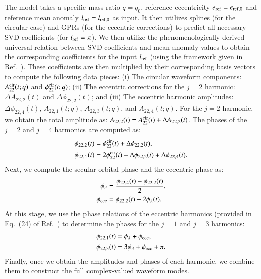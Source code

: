 \documentclass[aps,prd,amsmath,floats,floatfix, twocolumn,
superscriptaddress,nofootinbib,showpacs,longbibliography]{revtex4-1}
\begin{document}
The model takes a specific mass ratio $q = q_0$, reference eccentricity $e_{\rm ref} = e_{\rm ref,0}$ and reference mean anomaly $l_{\rm ref} = l_{\rm ref,0}$ as input. It then utilizes splines (for the circular case) and GPRs (for the eccentric corrections) to predict all necessary SVD coefficients (for $l_{\rm ref}=\pi$). We then utilize the phenomenologically derived universal relation between SVD coefficients and mean anomaly values to obtain the corresponding coefficients for the input $l_{\rm ref}$ (using the framework given in Ref.~\cite{Islam2025InPrep}).
These coefficients are then multiplied by their corresponding basis vectors to compute the following data pieces: (i) The circular waveform components: $A_{22}^{\rm cir}(t;q)$ and $\phi_{22}^{\rm cir}(t;q)$; (ii) The eccentric corrections for the $j=2$ harmonic: $\Delta A_{22,2}(t)$ and $\Delta \phi_{22,2}(t)$; and (iii) The eccentric harmonic amplitudes: $\Delta \phi_{22,4}(t)$, $A_{22,1}(t;q)$, $A_{22,3}(t;q)$, and $A_{22,4}(t;q)$.   
For the $j=2$ harmonic, we obtain the total amplitude as: $A_{22,2}(t) = A_{22}^{\rm cir}(t) + \Delta A_{22,2}(t)$.
The phases of the $j=2$ and $j=4$ harmonics are computed as:
\begin{align}
\phi_{22,2}(t) &= \phi_{22}^{\rm cir}(t) + \Delta \phi_{22,2}(t),\\
\phi_{22,4}(t) &= 2\phi_{22}^{\rm cir}(t) + \Delta \phi_{22,2}(t) + \Delta \phi_{22,4}(t).
\end{align}
Next, we compute the secular orbital phase and the eccentric phase as:
\begin{align}
\phi_{\lambda} &= \frac{\phi_{22,4}(t) - \phi_{22,2}(t)}{2},\\
\phi_{\rm ecc} &= \phi_{22,2}(t) - 2\phi_{\lambda}(t).
\end{align}
At this stage, we use the phase relations of the eccentric harmonics (provided in Eq.~(24) of Ref.~\cite{Islam2025InPrep}) to determine the phases for the $j=1$ and $j=3$ harmonics: 
\begin{align}
\phi_{22,1}(t) &= \phi_{\lambda} + \phi_{\rm ecc},\\
\phi_{22,3}(t) &= 3\phi_{\lambda} + \phi_{\rm ecc} + \pi.
\end{align}
Finally, once we obtain the amplitudes and phases of each harmonic, we combine them to construct the full complex-valued waveform modes.
\end{document}
